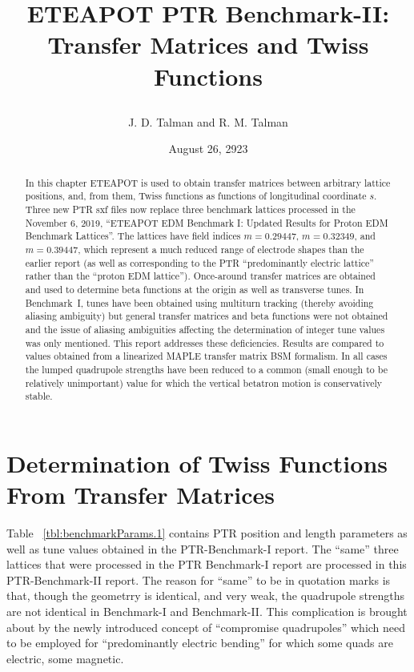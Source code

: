 \documentclass[]{article}
\begin{document}
\date{August 26, 2923}

\title{
\centerline{}
\centerline{}
\centerline{}
ETEAPOT PTR Benchmark-II: \\
Transfer Matrices and Twiss Functions 
}
\author{J. D. Talman and R. M. Talman
}

\maketitle


\begin{abstract}
In this chapter
ETEAPOT is used to obtain transfer matrices between arbitrary lattice positions,
and, from them, Twiss functions as functions of longitudinal coordinate $s$.
Three new PTR sxf files now replace three benchmark lattices processed in
the  November 6, 2019, ``ETEAPOT EDM Benchmark I: Updated Results for Proton 
EDM Benchmark Lattices''.  The lattices have field indices 
$m=0.29447$,  $m=0.32349$, and $m=0.39447$, which represent a much reduced
range of electrode shapes than the earlier report (as well as corresponding to the
PTR ``predominantly electric lattice'' rather than the ``proton EDM lattice'').
Once-around transfer matrices are obtained and used to determine beta functions 
at the origin as well as transverse tunes.  In Benchmark~I, tunes have been obtained 
using multiturn tracking (thereby avoiding aliasing ambiguity) but general transfer matrices 
and beta functions were not obtained and the issue of aliasing ambiguities affecting the 
determination of integer tune values was only mentioned.  This report addresses these
deficiencies.  Results are compared to values obtained from a linearized MAPLE 
transfer matrix BSM formalism. In all cases the lumped quadrupole strengths have been
reduced to a common (small enough to be relatively unimportant) value for which the 
vertical betatron motion is conservatively stable.  
\end{abstract}
%

\section{Determination of Twiss Functions From Transfer Matrices}
Table ~\ref{tbl:benchmarkParams.1} contains PTR position and length parameters as well as tune values 
obtained in the PTR-Benchmark-I report.   The ``same'' three lattices that were processed in the PTR
Benchmark-I  report are processed in this  PTR-Benchmark-II report.  The reason for ``same'' to be
in quotation marks is that, though the geometrry is identical, and very weak, the quadrupole strengths
are not identical in Benchmark-I and Benchmark-II.  This complication is brought about by the
newly introduced concept of ``compromise quadrupoles'' which need to be employed for 
``predominantly electric bending'' for which some quads are electric, some magnetic.
\end{document}
